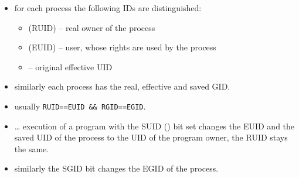 \begin{slide}
\begin{itemize}
\item for each process the following IDs are distinguished:
    \begin{itemize}
    \item {} (RUID) -- real owner of the process
    \item {} (EUID) -- user, whose rights are used by the
process
    \item {} -- original effective UID
    \end{itemize}
\item similarly each process has the real, effective and saved GID.
\item usually \texttt{RUID==EUID \&\& RGID==EGID}.
\item {} \dots{} execution of a program with
the SUID () bit set changes the EUID and the saved UID of the process
to the UID of the program owner, the RUID stays the same.
\item similarly the SGID bit changes the EGID of the process. 
\end{itemize}
\end{slide}


